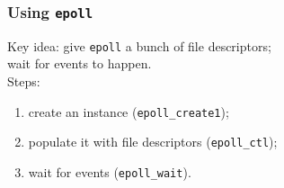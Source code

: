 \documentclass[aspectratio=43]{beamer}
\newenvironment{changemargin}[1]{%
  \begin{list}{}{%
    \setlength{\topsep}{0pt}%
    \setlength{\leftmargin}{#1}%
    \setlength{\rightmargin}{1em}
    \setlength{\listparindent}{\parindent}%
    \setlength{\itemindent}{\parindent}%
    \setlength{\parsep}{\parskip}%
  }%
  \item[]}{\end{list}}
\begin{document}
\begin{frame}
  \frametitle{Using {\tt epoll}}
  \begin{changemargin}{2em}
    Key idea: give {\tt epoll} a bunch of file descriptors;\\
     \hspace*{2em}wait for events to happen.\\[1em]

     Steps:
     \begin{enumerate}
       \item create an instance ({\tt epoll\_create1});
       \item populate it with file descriptors ({\tt epoll\_ctl});
       \item wait for events ({\tt epoll\_wait}).
     \end{enumerate}
  \end{changemargin}
\end{frame}
\end{document}
